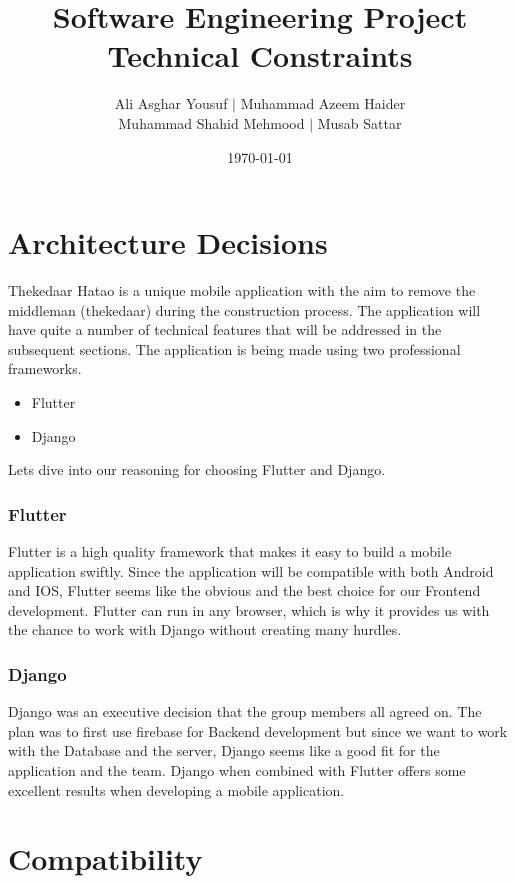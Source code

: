 \documentclass{article}
\title{Software Engineering Project Technical Constraints}
\author{Ali Asghar Yousuf $\mid$ Muhammad Azeem Haider\\
        Muhammad Shahid Mehmood $\mid$ Musab Sattar}
\date{\today}
\begin{document}
\maketitle

\section*{Architecture Decisions}

Thekedaar Hatao is a unique mobile application with the aim to remove the
middleman (thekedaar) during the construction process. The application will
have quite a number of technical features that will be addressed in the
subsequent sections. The application is being made using two professional
frameworks.

\begin{itemize}

        \item Flutter
        \item Django

\end{itemize}

Lets dive into our reasoning for choosing Flutter and Django.

\subsubsection*{Flutter}

Flutter is a high quality framework that makes it easy to build a mobile
application swiftly. Since the application will be compatible with both Android
and IOS, Flutter seems like the obvious and the best choice for our Frontend
development. Flutter can run in any browser, which is why it provides us with
the chance to work with Django without creating many hurdles.

\subsubsection*{Django}

Django was an executive decision that the group members all agreed on. The plan
was to first use firebase for Backend development but since we want to work
with the Database and the server, Django seems like a good fit for the
application and the team. Django when combined with Flutter offers some
excellent results when developing a mobile application.

\section*{Compatibility}
\end{document}
